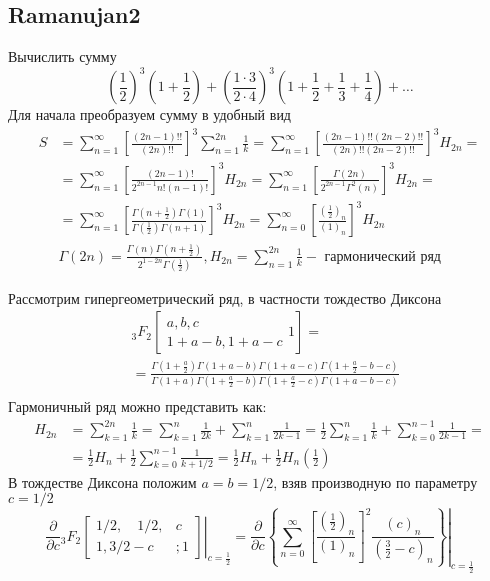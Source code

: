 	\subsection{Ramanujan2}
	
	Вычислить сумму
	$$
	\left(\frac{1}{2}\right)^3\left(1+\frac{1}{2}\right)+\left(\frac{1 \cdot 3}{2 \cdot 4}\right)^3\left(1+\frac{1}{2}+\frac{1}{3}+\frac{1}{4}\right)+\ldots
	$$
	Для начала преобразуем сумму в удобный вид
	$$
	\begin{aligned}
		S & =\sum_{n=1}^{\infty}\left[\frac{(2 n-1) ! !}{(2 n) ! !}\right]^3 \sum_{n=1}^{2 n} \frac{1}{k}=\sum_{n=1}^{\infty}\left[\frac{(2 n-1) ! !(2 n-2) ! !}{(2 n) ! !(2 n-2) ! !}\right]^3 H_{2 n}= \\
		& =\sum_{n=1}^{\infty}\left[\frac{(2 n-1) !}{2^{2 n-1} n !(n-1) !}\right]^3 H_{2 n}=\sum_{n=1}^{\infty}\left[\frac{\Gamma(2 n)}{2^{2 n-1} \Gamma^2(n)}\right]^3 H_{2 n}= \\
		& =\sum_{n=1}^{\infty}\left[\frac{\Gamma\left(n+\frac{1}{2}\right) \Gamma(1)}{\Gamma\left(\frac{1}{2}\right) \Gamma(n+1)}\right]^3 H_{2 n}=\sum_{n=0}^{\infty}\left[\frac{\left(\frac{1}{2}\right)_n}{(1)_n}\right]^3 H_{2 n} \\
		& \Gamma(2 n)=\frac{\Gamma(n) \Gamma\left(n+\frac{1}{2}\right)}{2^{1-2 n} \Gamma\left(\frac{1}{2}\right)}, H_{2 n}=\sum_{n=1}^{2 n} \frac{1}{k}-\text { гармонический ряд }
	\end{aligned}
	$$
	
	Рассмотрим гипергеометрический ряд, в частности тождество Диксона
	$$
	\begin{aligned}
		& { }_3 F_2\left[\begin{array}{c}
			a, b, c \\
			1+a-b, 1+a-c
		\end{array} 1\right]= \\
		& =\frac{\Gamma\left(1+\frac{a}{2}\right) \Gamma(1+a-b) \Gamma(1+a-c) \Gamma\left(1+\frac{a}{2}-b-c\right)}{\Gamma(1+a) \Gamma\left(1+\frac{a}{2}-b\right) \Gamma\left(1+\frac{a}{2}-c\right) \Gamma(1+a-b-c)} \\
		&
	\end{aligned}
	$$
	Гармоничный ряд можно представить как:
	$$
	\begin{aligned}
		H_{2 n} & =\sum_{k=1}^{2 n} \frac{1}{k}=\sum_{k=1}^n \frac{1}{2 k}+\sum_{k=1}^n \frac{1}{2 k-1}=\frac{1}{2} \sum_{k=1}^n \frac{1}{k}+\sum_{k=0}^{n-1} \frac{1}{2 k-1}= \\
		& =\frac{1}{2} H_n+\frac{1}{2} \sum_{k=0}^{n-1} \frac{1}{k+1 / 2}=\frac{1}{2} H_n+\frac{1}{2} H_n\left(\frac{1}{2}\right)
	\end{aligned}
	$$
	В тождестве Диксона положим $a=b=1 / 2$, взяв производную по параметру $c=1 / 2$
	$$
	\left.\frac{\partial}{\partial c}{ }_3 F_2\left[\begin{array}{cc}
		1 / 2, \quad 1 / 2, & c \\
		1,3 / 2-c & ; 1
	\end{array}\right]\right|_{c=\frac{1}{2}}=\left.\frac{\partial}{\partial c}\left\{\sum_{n=0}^{\infty}\left[\frac{\left(\frac{1}{2}\right)_n}{(1)_n}\right]^2 \frac{(c)_n}{\left(\frac{3}{2}-c\right)_n}\right\}\right|_{c=\frac{1}{2}}
	$$
	
